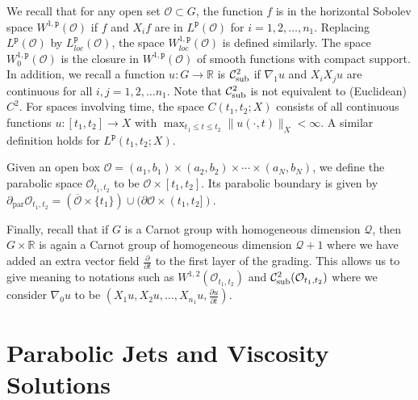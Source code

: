 \documentclass[12pt]{amsart}
\theoremstyle{definition}
\theoremstyle{remark}
\numberwithin{equation}{section}
\begin{document}
We recall that for any open set $\mathcal{O} \subset G$, the
function $f$ is in the horizontal Sobolev space $W^{1,{\texttt{p}}}(\mathcal{O})$ if
$f$ and $ X_if$ are in $ L^{\texttt{p}}(\mathcal{O}) $ for $i=1,2,\ldots , n_1$. Replacing $ L^{\texttt{p}}(\mathcal{O})$ by $L_{loc}^{\texttt{p}}(\mathcal{O})$, the space $ W_{loc}^{1,{\texttt{p}}}(\mathcal{O}) $ is defined similarly.  The space $W_{0}^{1,{\texttt{p}}}(\mathcal{O})$ is the closure in $W^{1,{\texttt{p}}}(\mathcal{O})$ of smooth functions with
compact support.  In addition, we recall a function $u:G\to
\mathbb{R}$ is ${\operatorname{\mathcal{C}^2_{\textmd{sub}}}}$ if $\nabla_1u$ and $X_iX_ju$ are continuous for
all $i,j=1,2,\ldots n_1$. Note that ${\operatorname{\mathcal{C}^2_{\textmd{sub}}}}$ is not equivalent to (Euclidean) $C^2$. 
For spaces involving time, the space $C(t_1,t_2;X)$ consists of all continuous functions $u:[t_1,t_2]\to X$ with $\max_{t_1\leq t\leq t_2} \|u(\cdot,t)\|_X <\infty$. A similar definition holds for $L^{\texttt{p}}(t_1,t_2;X)$. 

Given an open box $\mathcal{O}=(a_1,b_1)\times (a_2,b_2)\times \cdots \times (a_N,b_N)$, we define the parabolic space $\mathcal{O}_{t_1,t_2}$ to be $\mathcal{O} \times [t_1,t_2]$.  Its parabolic boundary is given by 
${\partial}_{\operatorname{par}}\mathcal{O}_{t_1,t_2} = (\overline{\mathcal{O}}\times \{t_1\}) \cup ({\partial} \mathcal{O}\times (t_1,t_2])$. 
 
Finally, recall that if $G$ is a Carnot group with homogeneous dimension $\mathcal{Q}$, then $G \times \mathbb{R}$ is again a Carnot group of homogeneous dimension $\mathcal{Q} + 1$ where we have added an extra vector field $\frac{\partial}{\partial t}$ to the first layer of the grading.  This allows us to give meaning to notations such as $W^{1,2}(\mathcal{O}_{t_1,t_2})$ and ${\operatorname{\mathcal{C}^2_{\textmd{sub}}}}(\mathcal{O}_{t_1,t_2})$ where we consider $\nabla_0u$ to be $\left(X_1u, X_2u, \ldots, X_{n_1}u, \frac{\partial u}{\partial t}\right)$.
\section{Parabolic Jets and Viscosity Solutions}
\end{document}
